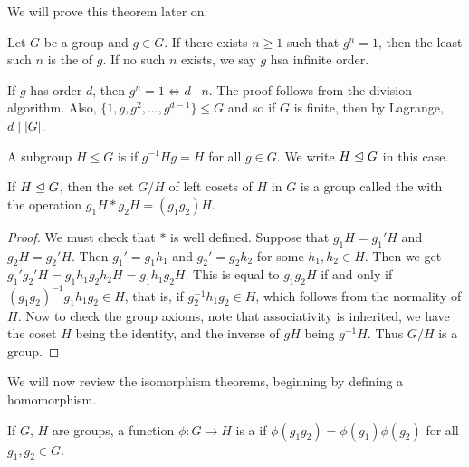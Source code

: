 \documentclass[a4paper]{scrartcl}
\begin{document}
We will prove this theorem later on.

\begin{definition}
	Let $G$ be a group and $g \in G$. If there exists $n \geq 1$ such that $g^n = 1$, then the least such $n$ is the  of $g$. If no such $n$ exists, we say $g$ hsa infinite order.
\end{definition}

\begin{remark} 
If $g$ has order $d$, then $g^n = 1 \iff d \mid n$. The proof follows from the division algorithm. Also, $\{1, g, g^2, \dots, g^{d - 1}\} \leq G$ and so if $G$ is finite, then by Lagrange, $d \mid |G|$.
\end{remark}

\begin{definition}
	A subgroup $H \leq G$ is  if $g^{-1} H g = H$ for all $g \in G$. We write $H \trianglelefteq G$ in this case.
\end{definition}

\begin{proposition}
	If $H \trianglelefteq G$, then the set $G/H$ of left cosets of $H$ in $G$ is a group called the  with the operation $g_1 H * g_2 H = (g_1 g_2) H$.
\end{proposition}
\begin{proof}
	We must check that $*$ is well defined. Suppose that $g_1H = g_1' H$ and $g_2H = g_2' H$. Then $g_1' = g_1 h_1$ and $g_2' = g_2 h_2$ for some $h_1, h_2 \in H$. Then we get $g_1' g_2' H = g_1 h_1 g_2 h_2 H = g_1 h_1 g_2 H$. This is equal to $g_1 g_2 H$ if and only if $(g_1 g_2)^{-1} g_1 h_1 g_2 \in H$, that is, if $g_2^{-1} h_1 g_2 \in H$, which follows from the normality of $H$. Now to check the group axioms, note that associativity is inherited, we have the coset $H$ being the identity, and the inverse of $gH$ being $g^{-1} H$. Thus $G/H$ is a group.
\end{proof}


We will now review the isomorphism theorems, beginning by defining a homomorphism.

\begin{definition}
	If $G$, $H$ are groups, a function $\phi: G \rightarrow H$ is a  if
	$
	\phi(g_1 g_2) = \phi(g_1) \phi(g_2)
	$
	for all $g_1, g_2 \in G$.
\end{definition}
\end{document}

